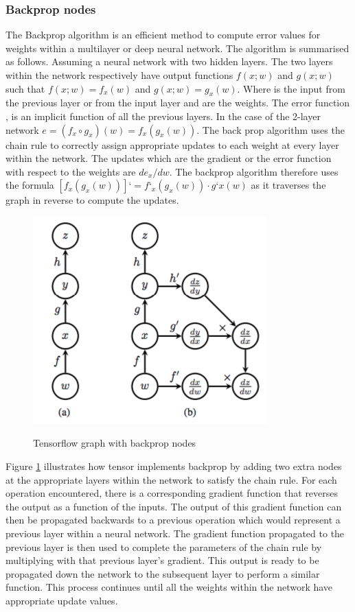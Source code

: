 \subsubsection{Backprop nodes}
The Backprop algorithm \cite{Goodfellow-et-al-2016} is an efficient method to compute error values for weights within a multilayer or deep neural network.  The algorithm is summarised as follows.  Assuming a neural network with two hidden layers. The two layers within the network respectively have output functions $f(x;w)$ and $g(x;w)$ such that $f(x;w)=f_x(w)$ and $g(x;w)=g_x(w)$.  Where  is the input from the previous layer or from the input layer and  are the weights.   The error function , is an implicit function of all the previous layers.  In the case of the 2-layer network $e=(f_x \circ g_x)(w)=f_x(g_x(w))$.  The back prop algorithm uses the chain rule to correctly assign appropriate updates to each weight at every layer within the network.  The updates which are the gradient or the error function with respect to the weights are $de_x/dw$. The backprop algorithm therefore uses the formula $[f_x(g_x(w))]‘=f‘_x(g_x(w))\cdot g‘x(w)$ as it traverses the graph in reverse to compute the updates. 
\begin{figure}
\centering
  \includegraphics[width=9cm]{thesis/images/bprop}\\
  \caption{Tensorflow graph with backprop nodes \citep{goldsborough2016tour}}\label{fig_c3_bprop}
\end{figure}

Figure \ref{fig_c3_bprop} illustrates how tensor implements backprop by adding two extra nodes at the appropriate layers within the network to satisfy the chain rule.  For each operation encountered, there is a corresponding gradient function that reverses the output as a function of the inputs.  The output of this gradient function can then be propagated backwards to a previous operation which would represent a previous layer within a neural network.  The gradient function propagated to the previous layer is then used to complete the parameters of the chain rule by multiplying with that previous layer’s gradient.  This output is ready to be propagated down the network to the subsequent layer to perform a similar function.  This process continues until all the weights within the network have appropriate update values.

